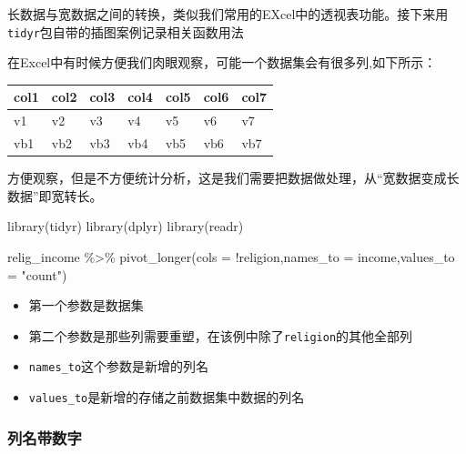 \documentclass[
]{book}
\newenvironment{Shaded}{\begin{snugshade}}{\end{snugshade}}
\newcommand{\AttributeTok}[1]{\textcolor[rgb]{0.77,0.63,0.00}{#1}}
\newcommand{\FunctionTok}[1]{\textcolor[rgb]{0.00,0.00,0.00}{#1}}
\newcommand{\NormalTok}[1]{#1}
\newcommand{\SpecialCharTok}[1]{\textcolor[rgb]{0.00,0.00,0.00}{#1}}
\newcommand{\StringTok}[1]{\textcolor[rgb]{0.31,0.60,0.02}{#1}}
\providecommand{\tightlist}{%
  \setlength{\itemsep}{0pt}\setlength{\parskip}{0pt}}
\begin{document}
长数据与宽数据之间的转换，类似我们常用的EXcel中的透视表功能。接下来用\texttt{tidyr}包自带的插图案例记录相关函数用法

在Excel中有时候方便我们肉眼观察，可能一个数据集会有很多列,如下所示：

\begin{longtable}[]{@{}lllllll@{}}
\toprule
col1 & col2 & col3 & col4 & col5 & col6 & col7 \\
\midrule
\endhead
v1 & v2 & v3 & v4 & v5 & v6 & v7 \\
vb1 & vb2 & vb3 & vb4 & vb5 & vb6 & vb7 \\
\bottomrule
\end{longtable}

方便观察，但是不方便统计分析，这是我们需要把数据做处理，从``宽数据变成长数据''即宽转长。

\begin{Shaded}
\begin{Highlighting}[]
\FunctionTok{library}\NormalTok{(tidyr)}
\FunctionTok{library}\NormalTok{(dplyr)}
\FunctionTok{library}\NormalTok{(readr)}
\end{Highlighting}
\end{Shaded}

\begin{Shaded}
\begin{Highlighting}[]
\NormalTok{relig\_income }\SpecialCharTok{\%\textgreater{}\%} 
  \FunctionTok{pivot\_longer}\NormalTok{(}\AttributeTok{cols =} \SpecialCharTok{!}\NormalTok{religion,}\AttributeTok{names\_to =} \StringTok{\textquotesingle{}income\textquotesingle{}}\NormalTok{,}\AttributeTok{values\_to =} \StringTok{"count"}\NormalTok{)}
\end{Highlighting}
\end{Shaded}

\begin{itemize}
\tightlist
\item
  第一个参数是数据集
\item
  第二个参数是那些列需要重塑，在该例中除了\texttt{religion}的其他全部列
\item
  \texttt{names\_to}这个参数是新增的列名
\item
  \texttt{values\_to}是新增的存储之前数据集中数据的列名
\end{itemize}

\hypertarget{ux5217ux540dux5e26ux6570ux5b57}{%
\subsubsection{列名带数字}\label{ux5217ux540dux5e26ux6570ux5b57}}
\end{document}

